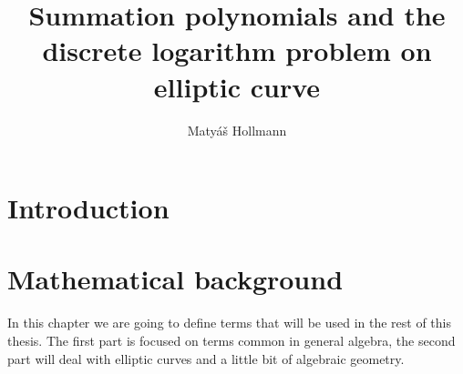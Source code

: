 \documentclass[thesis=M,english]{FITthesis}[2012/10/20]
\title{Summation polynomials and the discrete logarithm problem on elliptic curve}
\author{Matyáš Hollmann} %
\theoremstyle{remark}
\theoremstyle{definition}
\begin{document}

\chapter{Introduction}

\chapter{Mathematical background}\label{mathBG}
%
 In this chapter we are going to define terms that will be used in the rest of this thesis. The first part is focused on terms common in general algebra, the second part will deal with elliptic curves and a little bit of algebraic geometry. 
\end{document}
